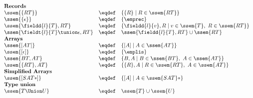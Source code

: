 \[
\begin{array}{lcll}
\text{\bf Records}\\
\ssem{\{RT\}} &\eqdef & 	\{ \{ R \} \mid R \in \ssem{RT} \} \\
\ssem{\{\epsilon\}} &\eqdef & 	 \{\emprec\} \\
\ssem{\fieldd{l}{T},RT} &\eqdef & \{  \fieldd{l}{v}, R \mid v \in \ssem{T}, \ R \in \ssem{RT} \}\\
\ssem{\fieldt{l}{T}\tunion\epsilon, RT} 	&\eqdef & 		\ssem{\fieldd{l}{T},RT} \cup  \ssem{RT} \\
%
\text{\bf Arrays}\\
\ssem{[AT]} &\eqdef & 	 \{ [A] \mid A\in \ssem{AT} \} \\
\ssem{[\epsilon]} &\eqdef & 	 \{\emplis\} \\
\ssem{BT , AT}  & \eqdef & 	\{ B , A \mid B\in \ssem{BT} , \  A \in \ssem{AT} \} \\ 
\ssem{\{RT\} , AT}  & \eqdef & 	\{ \{R\} , A \mid  R \in \ssem{RT}, \  A \in \ssem{AT} \} \\ 
\text{\bf Simplified Arrays}\\
\ssem{[SAT*]}  &\eqdef& \{[A] \mid A \in \ssem{SAT}*\}\\

\text{\bf Type union}\\
\ssem{T\Union U} 	&\eqdef & 		\ssem{T}\cup\ssem{U}\\
\end{array}
\]

